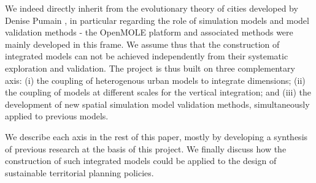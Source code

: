 We indeed directly inherit from the evolutionary theory of cities developed by Denise Pumain \cite{pumain2017urban}, in particular regarding the role of simulation models and model validation methods - the OpenMOLE platform and associated methods \cite{reuillon2013openmole} were mainly developed in this frame. We assume thus that the construction of integrated models can not be achieved independently from their systematic exploration and validation. The project is thus built on three complementary axis: (i) the coupling of heterogenous urban models to integrate dimensions; (ii) the coupling of models at different scales for the vertical integration; and (iii) the development of new spatial simulation model validation methods, simultaneously applied to previous models.

We describe each axis in the rest of this paper, mostly by developing a synthesis of previous research at the basis of this project. We finally discuss how the construction of such integrated models could be applied to the design of sustainable territorial planning policies.

 


